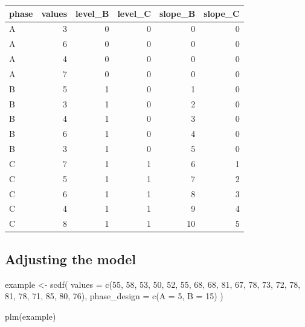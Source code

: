 \documentclass[
]{book}
\newenvironment{Shaded}{\begin{snugshade}}{\end{snugshade}}
\newcommand{\AttributeTok}[1]{\textcolor[rgb]{0.77,0.63,0.00}{#1}}
\newcommand{\DecValTok}[1]{\textcolor[rgb]{0.00,0.00,0.81}{#1}}
\newcommand{\FunctionTok}[1]{\textcolor[rgb]{0.00,0.00,0.00}{#1}}
\newcommand{\NormalTok}[1]{#1}
\newcommand{\OtherTok}[1]{\textcolor[rgb]{0.56,0.35,0.01}{#1}}
\begin{document}
\begin{tabular}{l|r|r|r|r|r}
\hline
phase & values & level\_B & level\_C & slope\_B & slope\_C\\
\hline
A & 3 & 0 & 0 & 0 & 0\\
\hline
A & 6 & 0 & 0 & 0 & 0\\
\hline
A & 4 & 0 & 0 & 0 & 0\\
\hline
A & 7 & 0 & 0 & 0 & 0\\
\hline
B & 5 & 1 & 0 & 1 & 0\\
\hline
B & 3 & 1 & 0 & 2 & 0\\
\hline
B & 4 & 1 & 0 & 3 & 0\\
\hline
B & 6 & 1 & 0 & 4 & 0\\
\hline
B & 3 & 1 & 0 & 5 & 0\\
\hline
C & 7 & 1 & 1 & 6 & 1\\
\hline
C & 5 & 1 & 1 & 7 & 2\\
\hline
C & 6 & 1 & 1 & 8 & 3\\
\hline
C & 4 & 1 & 1 & 9 & 4\\
\hline
C & 8 & 1 & 1 & 10 & 5\\
\hline
\end{tabular}

\hypertarget{adjusting-the-model}{%
\subsection{Adjusting the model}\label{adjusting-the-model}}

\begin{Shaded}
\begin{Highlighting}[]
\NormalTok{example }\OtherTok{\textless{}{-}} \FunctionTok{scdf}\NormalTok{(}
   \AttributeTok{values =} \FunctionTok{c}\NormalTok{(}\DecValTok{55}\NormalTok{, }\DecValTok{58}\NormalTok{, }\DecValTok{53}\NormalTok{, }\DecValTok{50}\NormalTok{, }\DecValTok{52}\NormalTok{, }\DecValTok{55}\NormalTok{, }\DecValTok{68}\NormalTok{, }\DecValTok{68}\NormalTok{, }\DecValTok{81}\NormalTok{, }\DecValTok{67}\NormalTok{, }\DecValTok{78}\NormalTok{, }\DecValTok{73}\NormalTok{, }\DecValTok{72}\NormalTok{, }\DecValTok{78}\NormalTok{, }\DecValTok{81}\NormalTok{, }\DecValTok{78}\NormalTok{, }\DecValTok{71}\NormalTok{, }\DecValTok{85}\NormalTok{, }\DecValTok{80}\NormalTok{, }\DecValTok{76}\NormalTok{),}
   \AttributeTok{phase\_design =} \FunctionTok{c}\NormalTok{(}\AttributeTok{A =} \DecValTok{5}\NormalTok{, }\AttributeTok{B =} \DecValTok{15}\NormalTok{)}
\NormalTok{)}

\FunctionTok{plm}\NormalTok{(example)}
\end{Highlighting}
\end{Shaded}
\end{document}
